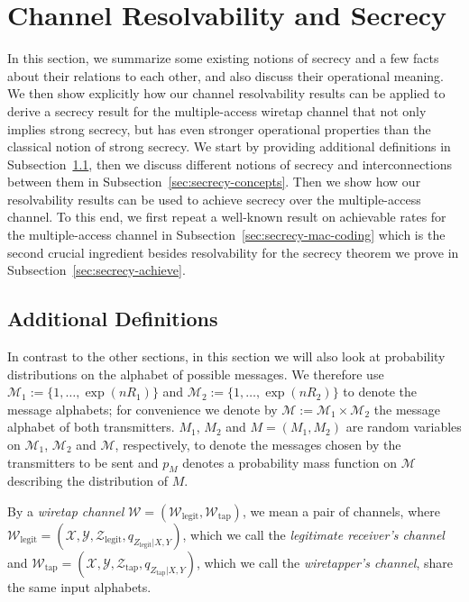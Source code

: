 \documentclass[journal]{IEEEtran}
\newcommand{\channelpmf}{q}
\newcommand{\codebookpmf}{p}
\newcommand{\codebookRateOne}{R_1}
\newcommand{\codebookRateTwo}{R_2}
\newcommand{\channelInOne}{X}
\newcommand{\channelInOneAlph}{\mathcal{X}}
\newcommand{\channelInTwo}{Y}
\newcommand{\channelInTwoAlph}{\mathcal{Y}}
\newcommand{\channelOut}{Z}
\newcommand{\channelOutAlph}{\mathcal{Z}}
\newcommand{\channel}{\mathcal{W}}
\newcommand{\channelWiretapper}{{\channel_\mathrm{tap}}}
\newcommand{\channelLegit}{{\channel_\mathrm{legit}}}
\newcommand{\channelOutAlphWiretapper}{\channelOutAlph_\mathrm{tap}}
\newcommand{\channelOutAlphLegit}{\channelOutAlph_\mathrm{legit}}
\newcommand{\channelOutWiretapper}{\channelOut_\mathrm{tap}}
\newcommand{\channelOutLegit}{\channelOut_\mathrm{legit}}
\newcommand{\codebookBlocklength}{n}
\newcommand{\messageRV}{M}
\newcommand{\messageAlphabet}{\mathcal{M}}
\begin{document}
\section{Channel Resolvability and Secrecy}
\label{sec:secrecy}

In this section, we summarize some existing notions of secrecy and a
few facts about their relations to each other, and also discuss their
operational meaning. We then show explicitly how our channel
resolvability results can be applied to derive a secrecy result for
the multiple-access wiretap channel that not only implies strong
secrecy, but has even stronger operational properties than the
classical notion of strong secrecy. We start by providing additional
definitions in Subsection~\ref{sec:secrecy-addiditonal-def}, then we
discuss different notions of secrecy and interconnections between them
in Subsection~\ref{sec:secrecy-concepts}. Then we show how our
resolvability results can be used to achieve secrecy over the
multiple-access channel. To this end, we first repeat a well-known
result on achievable rates for the multiple-access channel in
Subsection~\ref{sec:secrecy-mac-coding} which is the second crucial
ingredient besides resolvability for the secrecy theorem we prove in
Subsection~\ref{sec:secrecy-achieve}.

\subsection{Additional Definitions}
\label{sec:secrecy-addiditonal-def}
In contrast to the other sections, in this section we will also look at probability distributions on the alphabet of possible messages. We therefore use $\messageAlphabet_1 := \{1, \dots, \exp(\codebookBlocklength\codebookRateOne)\}$ and $\messageAlphabet_2 := \{1, \dots, \exp(\codebookBlocklength\codebookRateTwo)\}$ to denote the message alphabets; for convenience we denote by $\messageAlphabet := \messageAlphabet_1 \times \messageAlphabet_2$ the message alphabet of both transmitters. $\messageRV_1$, $\messageRV_2$ and $\messageRV = (\messageRV_1, \messageRV_2)$ are random variables on $\messageAlphabet_1$, $\messageAlphabet_2$ and $\messageAlphabet$, respectively, to denote the messages chosen by the transmitters to be sent and $\codebookpmf_\messageRV$ denotes a probability mass function on $\messageAlphabet$ describing the distribution of $\messageRV$.

By a \emph{wiretap channel} $\channel=(\channelLegit, \channelWiretapper)$, we mean a pair of channels, where $\channelLegit=(\channelInOneAlph, \channelInTwoAlph, \channelOutAlphLegit, \channelpmf_{\channelOutLegit | \channelInOne, \channelInTwo})$, which we call the \emph{legitimate receiver's channel} and $\channelWiretapper=(\channelInOneAlph, \channelInTwoAlph, \channelOutAlphWiretapper, \channelpmf_{\channelOutWiretapper | \channelInOne, \channelInTwo})$, which we call the \emph{wiretapper's channel}, share the same input alphabets.
\end{document}
